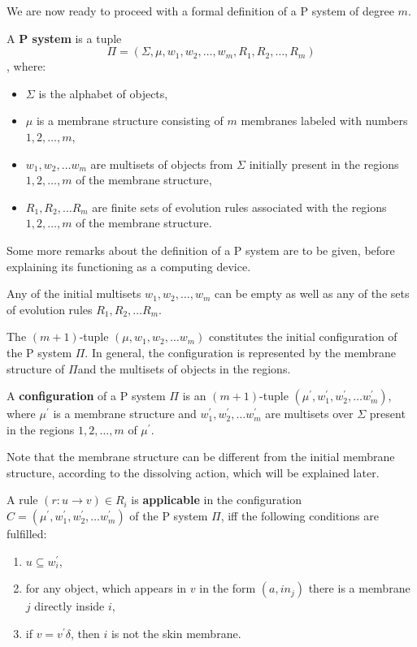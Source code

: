 We are now ready to proceed with a formal definition of a P system of degree $m$.

\begin{definition}
  A  {\bf P system} is a tuple $$\Pi = (\Sigma, \mu, w_1, w_2,\ldots , w_m, R_1, R_2,\ldots , R_m)$$, where:
  \begin{itemize}
    \item $\Sigma$ is the alphabet of objects,
    \item $\mu$ is a membrane structure consisting of $m$ membranes labeled with numbers $1,2,\dots,m$,
    \item $w_1,w_2,\ldots w_m$ are multisets of objects from $\Sigma$ initially present in the regions $1,2,\ldots,m$ of the membrane structure,
    \item $R_1,R_2,\ldots R_m$ are finite sets of evolution rules associated with the regions $1,2,\dots,m$ of the membrane structure.
  \end{itemize}
\end{definition}

Some more remarks about the definition of a P system are to be given, before explaining its functioning as a computing device.

Any of the initial multisets $w_1, w_2,\dots , w_m$ can be empty as well as any of the sets of evolution rules $R_1,R_2,\ldots R_m$.

The $(m+1)$-tuple $(\mu, w_1,w_2,\ldots w_m)$ constitutes the initial configuration of the P system $\Pi$. In general, the configuration is represented by the membrane structure of $\Pi$and the multisets of objects in the regions.

\begin{definition}
  A  {\bf configuration} of a P system $\Pi$ is an $(m+1)$-tuple $(\mu^\prime, w^\prime_1,w^\prime_2,\ldots w^\prime_m)$, where $\mu^\prime$ is a membrane structure and $w^\prime_1,w^\prime_2,\ldots w^\prime_m$ are multisets over $\Sigma$ present in the regions $1,2,\ldots,m$ of $\mu^\prime$.
\end{definition}

Note that the membrane structure can be different from the initial membrane structure, according to the dissolving action, which will be explained later.

\begin{definition}
  A rule $(r: u\rightarrow v)\in R_i$ is {\bf applicable} in the configuration $C = (\mu^\prime, w^\prime_1,w^\prime_2,\ldots w^\prime_m)$ of the P system $\Pi$, iff the following conditions are fulfilled:
  \begin{enumerate}
    \item $u\subseteq w^\prime_i$,
    \item for any object, which appears in $v$ in the form $(a, in_j)$ there is a membrane $j$ directly inside $i$,
    \item if $v=v^\prime\delta$, then $i$ is not the skin membrane.
  \end{enumerate}
\end{definition}

